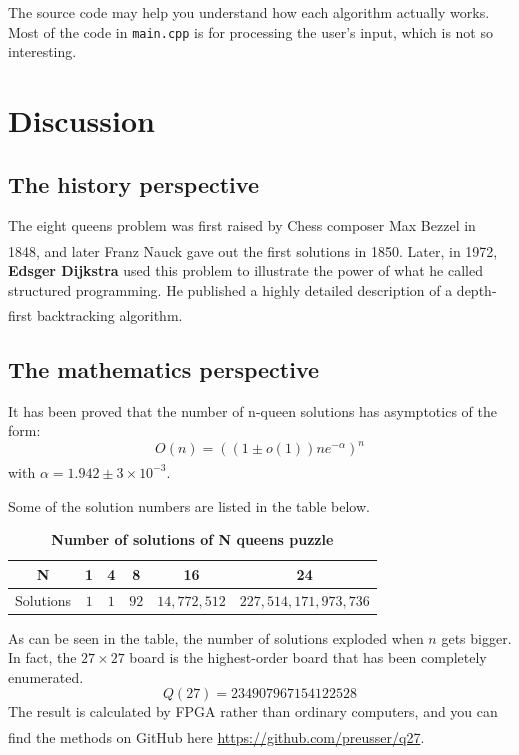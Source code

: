 \documentclass[cn,black,12pt,normal]{elegantnote}
\newcommand{\uct}[1]{\textsuperscript{\textsuperscript{\cite{#1}}}}
\begin{document}
The source code may help you understand how each algorithm actually works. Most of the code in \lstinline{main.cpp} is for processing the user's input, which is not so interesting.

\section{Discussion}

\subsection{The history perspective}
The eight queens problem was first raised by Chess composer Max Bezzel in 1848, and later Franz Nauck gave out the first solutions in 1850.\uct{rouse1960eight} Later, in 1972, \textbf{Edsger Dijkstra} used this problem to illustrate the power of what he called structured programming. He published a highly detailed description of a depth-first backtracking algorithm. \uct{wiki:Eight_queens_puzzle}

\subsection{The mathematics perspective}
It has been proved that the number of n-queen solutions has asymptotics of the form:
\begin{equation}
    O(n) = ((1\pm o(1))ne^{-\alpha})^n
\end{equation}
with $\alpha = 1.942 \pm 3 \times 10^{-3}$\uct{simkin2021number}.

Some of the solution numbers are listed in the table below.
\begin{table}[H]
    \caption{\textbf{Number of solutions of N queens puzzle}}
    \centering
    \begin{tabular}{c|ccccc}
        \toprule
        N         & 1   & 4   & 8    & 16          & 24                   \\
        \midrule
        Solutions & $1$ & $1$ & $92$ & $14,772,512$ & $227,514,171,973,736$ \\
        \bottomrule
    \end{tabular}
\end{table}

As can be seen in the table, the number of solutions exploded when $n$ gets bigger. In fact, the $27 \times 27$ board is the highest-order board that has been completely enumerated.
\begin{equation}
    Q(27) = 234907967154122528
\end{equation}
The result is calculated by FPGA rather than ordinary computers, and you can find the methods on GitHub here \url{https://github.com/preusser/q27}.\uct{preusser2017putting}



\end{document}

